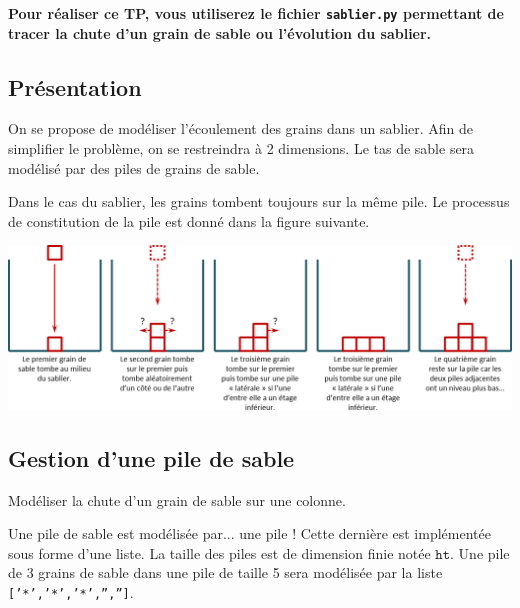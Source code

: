 \documentclass[10pt,fleqn]{article} %
\begin{document}

\vspace{5cm}
\pagestyle{fancy}
\thispagestyle{plain}


\def\columnseprulecolor{\color{ocre}}
\setlength{\columnseprule}{0.4pt} 
\begin{multicols}{2}

\textbf{Pour réaliser ce TP, vous utiliserez le fichier \texttt{sablier.py} permettant de tracer la chute d'un grain de sable ou l'évolution du sablier.}

\subsection*{Présentation}

On se propose de modéliser l'écoulement des grains dans un sablier. Afin de simplifier le problème, on se restreindra à 2 dimensions. Le tas de sable sera modélisé par des piles de grains de sable. 


Dans le cas du sablier, les grains tombent toujours sur la même pile. Le processus de constitution de la pile est donné dans la figure suivante.

\begin{center}
\includegraphics[width=\linewidth]{images/sablier_02}
\end{center}
\subsection*{Gestion d'une pile de sable}

\begin{obj}
Modéliser la chute d'un grain de sable sur une colonne. 
\end{obj}


Une pile de sable est modélisée par... une pile ! Cette dernière est implémentée sous forme d'une liste. 
La taille des piles est de dimension finie notée $\texttt{ht}$. 
Une pile de 3 grains de sable dans une pile de taille 5 sera modélisée par la liste \texttt{['*','*','*','','']}.



\end{multicols}
\end{document}
